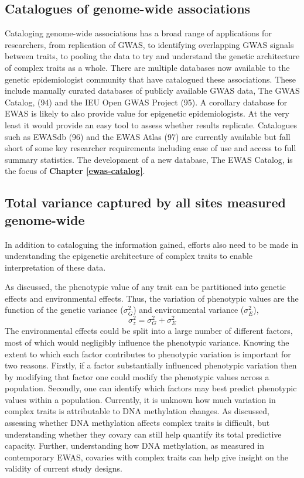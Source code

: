 \documentclass[11pt,oneside]{bristolthesis}
\begin{document}
\hypertarget{gwas-catalog}{%
\subsection{Catalogues of genome-wide associations}\label{gwas-catalog}}

Cataloging genome-wide associations has a broad range of applications for researchers, from replication of GWAS, to identifying overlapping GWAS signals between traits, to pooling the data to try and understand the genetic architecture of complex traits as a whole. There are multiple databases now available to the genetic epidemiologist community that have catalogued these associations. These include manually curated databases of publicly available GWAS data, The GWAS Catalog, (94) and the IEU Open GWAS Project (95). A corollary database for EWAS is likely to also provide value for epigenetic epidemiologists. At the very least it would provide an easy tool to assess whether results replicate. Catalogues such as EWASdb (96) and the EWAS Atlas (97) are currently available but fall short of some key researcher requirements including ease of use and access to full summary statistics. The development of a new database, The EWAS Catalog, is the focus of \textbf{Chapter \ref{ewas-catalog}}.

\hypertarget{heritability}{%
\subsection{Total variance captured by all sites measured genome-wide}\label{heritability}}

In addition to cataloguing the information gained, efforts also need to be made in understanding the epigenetic architecture of complex traits to enable interpretation of these data.

As discussed, the phenotypic value of any trait can be partitioned into genetic effects and environmental effects. Thus, the variation of phenotypic values are the function of the genetic variance (\(\sigma^2_{G}\)) and environmental variance (\(\sigma^2_{E}\)),
\begin{equation}
    \sigma^2_{z} = \sigma^2_{G} + \sigma^2_{E}
    \label{eq:phenotypic-variance}
\end{equation}
The environmental effects could be split into a large number of different factors, most of which would negligibly influence the phenotypic variance. Knowing the extent to which each factor contributes to phenotypic variation is important for two reasons. Firstly, if a factor substantially influenced phenotypic variation then by modifying that factor one could modify the phenotypic values across a population. Secondly, one can identify which factors may best predict phenotypic values within a population. Currently, it is unknown how much variation in complex traits is attributable to DNA methylation changes. As discussed, assessing whether DNA methylation affects complex traits is difficult, but understanding whether they covary can still help quantify its total predictive capacity. Further, understanding how DNA methylation, as measured in contemporary EWAS, covaries with complex traits can help give insight on the validity of current study designs.
\end{document}
